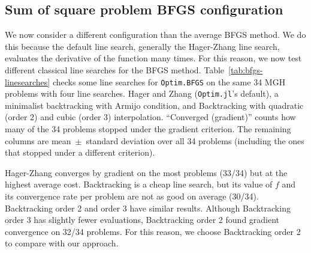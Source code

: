 \documentclass{article}
\begin{document}
\subsection{Sum of square problem BFGS configuration}

We now consider a different configuration than the average BFGS method. We do this because the default line search, generally the Hager-Zhang line search, evaluates the derivative of the function many times. For this reason, we now test different classical line searches for the BFGS method. Table~\ref{tab:bfgs-linesearches} checks some line searches for
\texttt{Optim.BFGS} on the same 34 MGH problems with four line searches. Hager and Zhang (\texttt{Optim.jl}'s default), a
minimalist backtracking with Armijo condition, and Backtracking
with quadratic (order 2) and cubic (order 3) interpolation. ``Converged
(gradient)'' counts how many of the 34 problems stopped under the gradient
criterion. The remaining columns are mean~$\pm$~standard deviation over
all 34 problems (including the ones that stopped under a different
criterion).

\begin{table}[htbp]
	\centering
	\caption{Comparison of line searches for Optim.jl's BFGS on the 34 MGH problems.}
	\label{tab:bfgs-linesearches}
\end{table}
\FloatBarrier

\noindent
Hager-Zhang converges by gradient on the most problems (33/34) but at the
highest average cost. Backtracking is a cheap line search, but its value of $f$ and its convergence rate per
problem are not as good on average (30/34). Backtracking order 2 and order 3 have similar results. Although Backtracking order 3 has slightly fewer evaluations, Backtracking order 2 found gradient convergence on 32/34 problems. For this reason, we choose Backtracking order 2 to compare with our approach.
\end{document}
